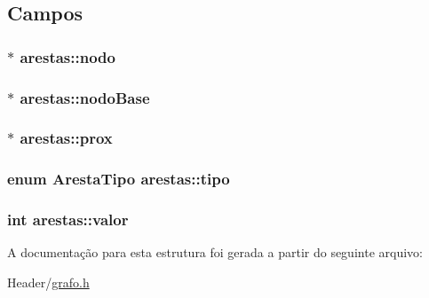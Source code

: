 \subsection{Campos}
\hypertarget{structarestas_ac64df5b62250b21f26521387c45390bb}{
\subsubsection[{nodo}]{$\ast$ {\bf arestas::nodo}}}
\label{structarestas_ac64df5b62250b21f26521387c45390bb}
\hypertarget{structarestas_a9729554d791b184a5175d138f71fee27}{
\subsubsection[{nodoBase}]{$\ast$ {\bf arestas::nodoBase}}}
\label{structarestas_a9729554d791b184a5175d138f71fee27}
\hypertarget{structarestas_ad0c8e430207210539b316ac224977f81}{
\subsubsection[{prox}]{$\ast$ {\bf arestas::prox}}}
\label{structarestas_ad0c8e430207210539b316ac224977f81}
\hypertarget{structarestas_afc465e4a2aa3103225805d38b9ac6123}{
\subsubsection[{tipo}]{\setlength{\rightskip}{0pt plus 5cm}enum {\bf ArestaTipo} {\bf arestas::tipo}}}
\label{structarestas_afc465e4a2aa3103225805d38b9ac6123}
\hypertarget{structarestas_a199638f57a0f2b6cf803f8f80601d9b1}{
\subsubsection[{valor}]{\setlength{\rightskip}{0pt plus 5cm}int {\bf arestas::valor}}}
\label{structarestas_a199638f57a0f2b6cf803f8f80601d9b1}


A documentação para esta estrutura foi gerada a partir do seguinte arquivo:\begin{DoxyCompactItemize}
\item 
Header/\hyperlink{grafo_8h}{grafo.h}\end{DoxyCompactItemize}
